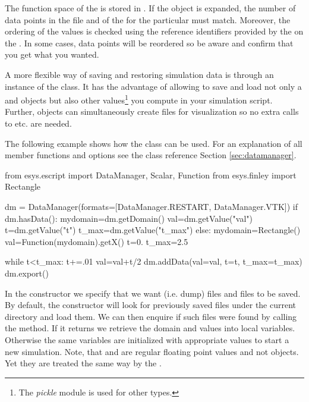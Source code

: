 The function space of the \Data is stored in .
If the \Data object is expanded, the number of data points in the file and of
the \Domain for the particular \FunctionSpace must match.
Moreover, the ordering of the values is checked using the reference
identifiers provided by the \FunctionSpace on the \Domain.
In some cases, data points will be reordered so be aware and confirm that you
get what you wanted.

A more flexible way of saving and restoring \escript simulation data
is through an instance of the  class.
It has the advantage of allowing to save and load not only a \Domain and
\Data objects but also other values\footnote{The \PYTHON \emph{pickle} module
is used for other types.} you compute in your simulation script.
Further,  objects can simultaneously create files for
visualization so no extra calls to  etc. are needed.

The following example shows how the  class can be used.
For an explanation of all member functions and options see the class reference
Section \ref{sec:datamanager}.
\begin{python}
  from esys.escript import DataManager, Scalar, Function
  from esys.finley import Rectangle

  dm = DataManager(formats=[DataManager.RESTART, DataManager.VTK])
  if dm.hasData():
    mydomain=dm.getDomain()
    val=dm.getValue("val")
    t=dm.getValue("t")
    t_max=dm.getValue("t_max")
  else:
    mydomain=Rectangle()
    val=Function(mydomain).getX()
    t=0.
    t_max=2.5

  while t<t_max:
    t+=.01
    val=val+t/2
    dm.addData(val=val, t=t, t_max=t_max)
    dm.export()
\end{python}
In the constructor we specify that we want  (i.e. dump) files
and  files to be saved.
By default, the constructor will look for previously saved 
files under the current directory and load them.
We can then enquire if such files were found by calling the 
method. If it returns \True we retrieve the domain and values into local
variables. Otherwise the same variables are initialized with appropriate
values to start a new simulation.
Note, that  and  are regular floating point values and not
\Data objects. Yet they are treated the same way by the .

